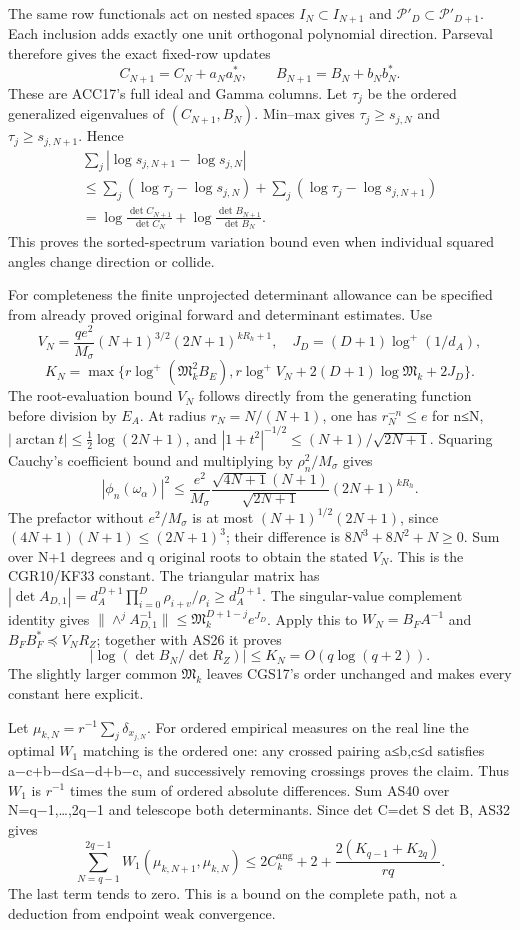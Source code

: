 \documentclass[11pt]{article}
\begin{document}
The same row functionals act on nested spaces \(I_N\subset I_{N+1}\) and \(\mathcal P'_D\subset\mathcal P'_{D+1}\). Each inclusion adds exactly one unit orthogonal polynomial direction. Parseval therefore gives the exact fixed-row updates \[
C_{N+1}=C_N+a_Na_N^*,\qquad B_{N+1}=B_N+b_Nb_N^*.
\tag{AS39}
\] These are ACC17's full ideal and Gamma columns. Let \(\tau _j\) be the ordered generalized eigenvalues of \((C_{N+1},B_N)\). Min--max gives \(\tau_j\ge s_{j,N}\) and \(\tau_j\ge s_{j,N+1}\). Hence \[\begin{gathered}
\sum_j|\log s_{j,N+1}-\log s_{j,N}|
\\\le\sum_j(\log\tau_j-\log s_{j,N})
+\sum_j(\log\tau_j-\log s_{j,N+1})
\\=\log\frac{\det C_{N+1}}{\det C_N}
+\log\frac{\det B_{N+1}}{\det B_N}.
\end{gathered}\tag{AS40}\] This proves the sorted-spectrum variation bound even when individual squared angles change direction or collide.

For completeness the finite unprojected determinant allowance can be specified from already proved original forward and determinant estimates. Use \[
V_N=\frac{qe^2}{M_\sigma}(N+1)^{3/2}(2N+1)^{kR_h+1},
\quad J_D=(D+1)\log^+(1/d_A),
\] \[
K_N=\max\{r\log^+(\mathfrak M_k^2B_E),
r\log^+V_N+2(D+1)\log\mathfrak M_k+2J_D\}.
\tag{AS41}
\] The root-evaluation bound \(V_N\) follows directly from the generating function before division by \(E_A\). At radius \(r_N=N/(N+1)\), one has \(r_N^{-n}\le e\) for n≤N, \(|\arctan t|\le\tfrac12\log(2N+1)\), and \(|1+t^2|^{-1/2}\le(N+1)/\sqrt{2N+1}\). Squaring Cauchy's coefficient bound and multiplying by \(\rho_n^2/M_\sigma\) gives \[
|\phi_n(\omega_\alpha)|^2\le\frac{e^2}{M_\sigma}
\frac{\sqrt{4N+1}(N+1)}{\sqrt{2N+1}}(2N+1)^{kR_h}.
\] The prefactor without \(e^2/M_\sigma\) is at most \((N+1)^{1/2}(2N+1)\), since \((4N+1)(N+1)\le(2N+1)^3\); their difference is \(8N^3+8N^2+N\ge0\). Sum over N+1 degrees and q original roots to obtain the stated \(V_N\). This is the CGR10/KF33 constant. The triangular matrix has \(|\det A_{D,1}|=d_A^{D+1}\prod_{i=0}^D\rho_{i+v}/\rho_i\ge d_A^{D+1}\). The singular-value complement identity gives \(\|\wedge^j A_{D,1}^{-1}\|\le\mathfrak M_k^{D+1-j}e^{J_D}\). Apply this to \(W_N=B_FA^{-1}\) and \(B_FB_F^*\preceq V_NR_Z\); together with AS26 it proves \[
|\log(\det B_N/\det R_Z)|\le K_N=O(q\log(q+2)).
\tag{AS42}
\] The slightly larger common \(\mathfrak M_k\) leaves CGS17's order unchanged and makes every constant here explicit.

Let \(\mu_{k,N}=r^{-1}\sum_j\delta_{x_{j,N}}\). For ordered empirical measures on the real line the optimal \(W_1\) matching is the ordered one: any crossed pairing a≤b,c≤d satisfies \textbar a−c\textbar+\textbar b−d\textbar≤\textbar a−d\textbar+\textbar b−c\textbar, and successively removing crossings proves the claim. Thus \(W_1\) is \(r^{-1}\) times the sum of ordered absolute differences. Sum AS40 over N=q−1,\ldots,2q−1 and telescope both determinants. Since det C=det S det B, AS32 gives \[
\sum_{N=q-1}^{2q-1}W_1(\mu_{k,N+1},\mu_{k,N})
\le2C_k^{\mathrm{ang}}+2+
\frac{2(K_{q-1}+K_{2q})}{rq}.
\tag{AS43}
\] The last term tends to zero. This is a bound on the complete path, not a deduction from endpoint weak convergence.
\end{document}
